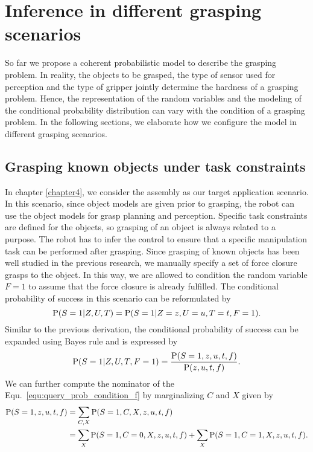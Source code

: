 \section{Inference in different grasping scenarios}
So far we propose a coherent probabilistic model to describe the grasping problem. In reality, the objects to be grasped, the type of sensor used for perception and the type of gripper jointly determine the hardness of a grasping problem. Hence, the representation of the random variables and the modeling of the conditional probability distribution can vary with the condition of a grasping problem. In the following sections, we elaborate how we configure the model in different grasping scenarios. 

\subsection{Grasping known objects under task constraints}
In chapter \ref{chapter4}, we consider the assembly as our target application scenario. In this scenario, since object models are given prior to grasping, the robot can use the object models for grasp planning and perception. Specific task constraints are defined for the objects, so grasping of an object is always related to a purpose. The robot has to infer the control to ensure that a specific manipulation task can be performed after grasping. Since grasping of known objects has been well studied in the previous research, we manually specify a set of force closure grasps to the object. In this way, we are allowed to condition the random variable $F=1$ to assume that the force closure is already fulfilled. The conditional probability of success in this scenario can be reformulated by 
\begin{equation}
\operatorname*{\text{P}} (S = 1| Z, U ,T) = \operatorname*{\text{P}}(S = 1|Z=z,U=u,T=t, F=1). 
\end{equation}
Similar to the previous derivation, the conditional probability of success can be expanded using Bayes rule and is expressed by 
\begin{equation}
\operatorname*{\text{P}} (S = 1| Z, U ,T, F = 1) =  \frac{\operatorname*{\text{P}}(S = 1, z, u, t, f)}{\operatorname*{\text{P}}(z,u,t,f)}.  
\label{equ:query_prob_condition_f}
\end{equation}
We can further compute the nominator of the Equ.~\ref{equ:query_prob_condition_f} by marginalizing $C$ and $X$ given by 
\begin{equation}
\begin{split}
\operatorname*{\text{P}}(S = 1, z, u, t, f) &= \sum_{C,X} \operatorname*{\text{P}} (S=1,C,X,z,u,t,f)  \\
                       &= \sum_{X}  \operatorname*{\text{P}} (S=1, C = 0, X, z,u,t,f) + \sum_{X} \operatorname*{\text{P}}(S=1,C=1,X,z,u,t,f).
\end{split}
\label{equ:marginalization_task}
\end{equation}
